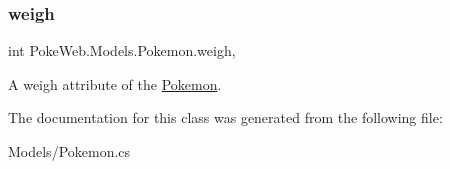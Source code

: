 \subsubsection{\texorpdfstring{weigh}{weigh}}
{\footnotesize\ttfamily int Poke\+Web.\+Models.\+Pokemon.\+weigh\hspace{0.3cm}{\ttfamily [get]}, {\ttfamily [set]}}

A weigh attribute of the \mbox{\hyperlink{class_poke_web_1_1_models_1_1_pokemon}{Pokemon}}. 

The documentation for this class was generated from the following file\+:\begin{DoxyCompactItemize}
\item 
Models/Pokemon.\+cs\end{DoxyCompactItemize}
